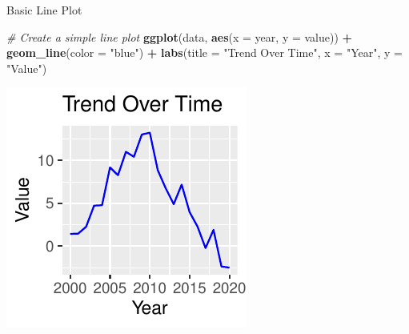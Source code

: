 \documentclass[
  ignorenonframetext,
]{beamer}
\newenvironment{Shaded}{\begin{snugshade}}{\end{snugshade}}
\newcommand{\AttributeTok}[1]{\textcolor[rgb]{0.13,0.29,0.53}{#1}}
\newcommand{\CommentTok}[1]{\textcolor[rgb]{0.56,0.35,0.01}{\textit{#1}}}
\newcommand{\FunctionTok}[1]{\textcolor[rgb]{0.13,0.29,0.53}{\textbf{#1}}}
\newcommand{\NormalTok}[1]{#1}
\newcommand{\SpecialCharTok}[1]{\textcolor[rgb]{0.81,0.36,0.00}{\textbf{#1}}}
\newcommand{\StringTok}[1]{\textcolor[rgb]{0.31,0.60,0.02}{#1}}
\begin{document}
\begin{frame}[fragile]{Basic Line Plot}
\label{basic-line-plot}

\begin{Shaded}
\begin{Highlighting}[]
\CommentTok{\# Create a simple line plot}
\FunctionTok{ggplot}\NormalTok{(data, }\FunctionTok{aes}\NormalTok{(}\AttributeTok{x =}\NormalTok{ year, }\AttributeTok{y =}\NormalTok{ value)) }\SpecialCharTok{+} \FunctionTok{geom\_line}\NormalTok{(}\AttributeTok{color =} \StringTok{"blue"}\NormalTok{) }\SpecialCharTok{+}
    \FunctionTok{labs}\NormalTok{(}\AttributeTok{title =} \StringTok{"Trend Over Time"}\NormalTok{, }\AttributeTok{x =} \StringTok{"Year"}\NormalTok{, }\AttributeTok{y =} \StringTok{"Value"}\NormalTok{)}
\end{Highlighting}
\end{Shaded}

\begin{center}\includegraphics[width=0.5\linewidth]{Figs/unnamed-chunk-56-1} \end{center}
\end{frame}
\end{document}
